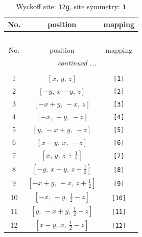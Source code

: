 \documentclass[fleqn,8pt]{jsarticle}
\begin{document}
\renewcommand{\arraystretch}{1.2}
\begin{longtable}{ccc}
\caption{Wyckoff site: {\tt 12g}, site symmetry: {\tt 1}}
 \\
 \hline \hline
No. & position & mapping \\ \hline \endfirsthead

\multicolumn{2}{l}{\tablename\ \thetable{}} \\
 \hline \hline
No. & position & mapping \\ \hline \endhead

 \hline \hline
\multicolumn{2}{r}{\footnotesize\it continued ...} \\ \endfoot

 \hline \hline
\multicolumn{2}{r}{} \\ \endlastfoot

1 & $\left[ x,\, y,\, z \right]$ & {\tt [1]} \\ \hline
2 & $\left[ - y,\, x - y,\, z \right]$ & {\tt [2]} \\ \hline
3 & $\left[ - x + y,\, - x,\, z \right]$ & {\tt [3]} \\ \hline
4 & $\left[ - x,\, - y,\, - z \right]$ & {\tt [4]} \\ \hline
5 & $\left[ y,\, - x + y,\, - z \right]$ & {\tt [5]} \\ \hline
6 & $\left[ x - y,\, x,\, - z \right]$ & {\tt [6]} \\ \hline
7 & $\left[ x,\, y,\, z + \frac{1}{2} \right]$ & {\tt [7]} \\ \hline
8 & $\left[ - y,\, x - y,\, z + \frac{1}{2} \right]$ & {\tt [8]} \\ \hline
9 & $\left[ - x + y,\, - x,\, z + \frac{1}{2} \right]$ & {\tt [9]} \\ \hline
10 & $\left[ - x,\, - y,\, \frac{1}{2} - z \right]$ & {\tt [10]} \\ \hline
11 & $\left[ y,\, - x + y,\, \frac{1}{2} - z \right]$ & {\tt [11]} \\ \hline
12 & $\left[ x - y,\, x,\, \frac{1}{2} - z \right]$ & {\tt [12]} \\
\end{longtable}
\end{document}
